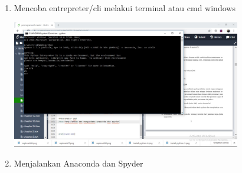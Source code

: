 \begin{enumerate}
\item Mencoba entrepreter/cli melakui terminal atau cmd windows
\begin{center}
    \includegraphics[width=10cm]{figures/Inter.jpeg}
\end{center}

\item 	Menjalankan Anaconda dan Spyder


\end{enumerate}
